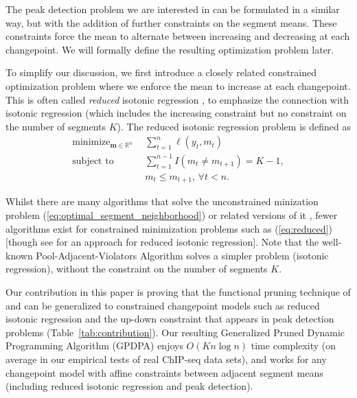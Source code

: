 \documentclass[aoas]{imsart}
\DeclareMathOperator*{\minimize}{minimize}
\newcommand{\RR}{\mathbb R}
\begin{document}
The peak detection problem we are interested in can be formulated in a similar way, but with
the addition of further constraints on the segment means. These constraints force the mean
to alternate between increasing and decreasing at each changepoint. We will formally define the resulting
optimization problem later.

To simplify our discussion, we first introduce a closely related
constrained optimization problem where we enforce the mean to increase
at each changepoint. This is often called \emph{reduced} isotonic regression
\citep{reduced-monotonic-regression}, to emphasize the connection with
isotonic regression (which includes the increasing
constraint but no constraint on the number of segments $K$). The
reduced isotonic regression problem is defined as
\begin{align}
  \label{eq:reduced}
  \minimize_{\mathbf m\in\RR^n} &\ \ 
  \sum_{t=1}^n \ell(y_t, m_t)\\
  \text{subject to} &\ \  \sum_{t=1}^{n-1} I(m_t \neq m_{t+1}) = K-1,
  \nonumber\\
  &\ \  m_t \leq m_{t+1},\, \forall t<n.
  \nonumber 
\end{align}

Whilst there are many algorithms that solve the unconstrained
minization problem (\ref{eq:optimal_segment_neighborhood})
\citep{segment-neighborhood,pruned-dp,phd-johnson} or related versions
of it \citep{optimal-partitioning,pelt,fpop,flsa}, fewer algorithms
exist for constrained minimization problems such as (\ref{eq:reduced})
[though see \citet{hardwick2014optimal} for an approach for reduced
isotonic regression]. Note that the well-known Pool-Adjacent-Violators
Algorithm \citep{mair2009isotone} solves a simpler problem (isotonic
regression), without the constraint on the number of segments $K$.

Our contribution in this paper is proving
that the functional pruning technique of \citet{pruned-dp} and
\citet{fpop} can be generalized to constrained changepoint models such
as reduced isotonic regression and the up-down constraint that appears
in peak detection problems (Table~\ref{tab:contribution}). Our
resulting Generalized Pruned Dynamic Programming Algorithm (GPDPA)
enjoys $O(Kn\log n)$ time complexity (on average in our empirical
tests of real ChIP-seq data sets), and works for any changepoint model
with affine constraints between adjacent segment means (including
reduced isotonic regression and peak detection).
\end{document}
